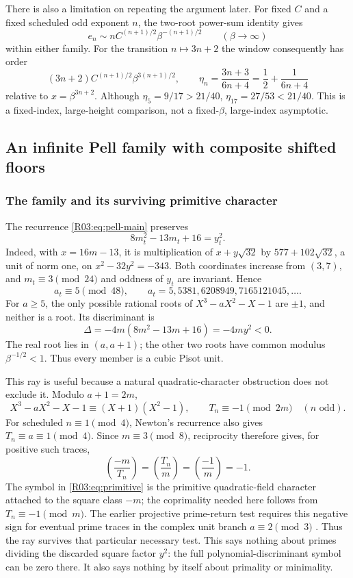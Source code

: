 \documentclass[11pt,a4paper]{article}
\theoremstyle{definition}\newtheorem{definition}[theorem]{Definition}
\theoremstyle{remark}\newtheorem{remark}[theorem]{Remark}
\begin{document}
There is also a limitation on repeating the argument later. For
fixed $C$ and a fixed scheduled odd exponent $n$, the two-root
power-sum identity gives
\[
 e_n\sim nC^{(n+1)/2}\beta^{-(n+1)/2}\qquad(\beta\to\infty)
\]
within either family. For the transition $n\mapsto3n+2$ the
window consequently has order
\[
 (3n+2)C^{(n+1)/2}\beta^{3(n+1)/2},\qquad
 \eta_n=\frac{3n+3}{6n+4}=\frac12+\frac1{6n+4}
\]
relative to $x=\beta^{3n+2}$. Although $\eta_5=9/17>21/40$,
$\eta_{17}=27/53<21/40$. This is a fixed-index, large-height
comparison, not a fixed-$\beta$, large-index asymptotic.

\subsection{An infinite Pell family with composite shifted floors}
\label{R03:sec:pell}

\subsubsection{The family and its surviving primitive character}

The recurrence \eqref{R03:eq:pell-main} preserves
\begin{equation}\label{R03:eq:pell}
 8m_t^2-13m_t+16=y_t^2.
\end{equation}
Indeed, with $x=16m-13$, it is multiplication of $x+y\sqrt{32}$
by $577+102\sqrt{32}$, a unit of norm one, on
$x^2-32y^2=-343$. Both coordinates increase from $(3,7)$, and
$m_t\equiv3\pmod{24}$ and oddness of $y_t$ are invariant. Hence
\[
 a_t\equiv5\pmod{48},\qquad
 a_t=5,5381,6208949,7165121045,\ldots.
\]
For $a\ge5$, the only possible rational roots of
$X^3-aX^2-X-1$ are $\pm1$, and neither is a root. Its discriminant is
\begin{equation}\label{R03:eq:disc-pell}
 \Delta=-4m(8m^2-13m+16)=-4my^2<0.
\end{equation}
The real root lies in $(a,a+1)$; the other two roots have common
modulus $\beta^{-1/2}<1$. Thus every member is a cubic Pisot unit.

This ray is useful because a natural quadratic-character obstruction
does not exclude it. Modulo $a+1=2m$,
\[
 X^3-aX^2-X-1\equiv(X+1)(X^2-1),
 \qquad T_n\equiv-1\pmod{2m}\quad(n\text{ odd}).
\]
For scheduled $n\equiv1\pmod4$, Newton's recurrence also gives
$T_n\equiv a\equiv1\pmod4$. Since $m\equiv3\pmod8$, reciprocity
therefore gives, for positive such traces,
\begin{equation}\label{R03:eq:primitive}
 \left(\frac{-m}{T_n}\right)
 =\left(\frac{T_n}{m}\right)
 =\left(\frac{-1}{m}\right)=-1.
\end{equation}
The symbol in \eqref{R03:eq:primitive} is the primitive quadratic-field
character attached to the square class $-m$; the coprimality needed
here follows from $T_n\equiv-1\pmod m$.
The earlier projective prime-return test requires this negative sign
for eventual prime traces in the complex unit branch $a\equiv2\pmod3$
\cite{R02}. Thus the ray survives that particular necessary test.
This says nothing about primes dividing the discarded square factor
$y^2$: the full polynomial-discriminant symbol can be zero there.
It also says nothing by itself about primality or minimality.
\end{document}

